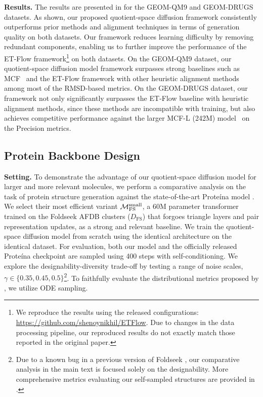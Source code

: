 \documentclass{article} %
\begin{document}
\textbf{Results.} The results are presented in  for the GEOM-QM9 and GEOM-DRUGS datasets. As shown, our proposed quotient-space diffusion framework consistently outperforms prior methods and alignment techniques in terms of generation quality on both datasets. Our framework reduces learning difficulty by removing redundant components, enabling us to further improve the performance of the ET-Flow framework\footnote{We reproduce the results using the released configurations: \url{https://github.com/shenoynikhil/ETFlow}. Due to changes in the data processing pipeline, our reproduced results do not exactly match those reported in the original paper.} on both datasets. %
On the GEOM-QM9 dataset, our quotient-space diffusion model framework surpasses strong baselines such as MCF~\citep{wang2023swallowing} and the ET-Flow framework with other heuristic alignment methods among most of the RMSD-based metrics. On the GEOM-DRUGS dataset, our framework not only significantly surpasses the ET-Flow baseline with heuristic alignment methods, since these methods are incompatible with training, but also achieves competitive performance against the larger MCF-L (242M) model~\citep{wang2023swallowing} on the Precision metrics. %



\subsection{Protein Backbone Design}


\textbf{Setting.} To demonstrate the advantage of our quotient-space diffusion model for larger and more relevant molecules,
we perform a comparative analysis on the task of protein structure generation against the state-of-the-art Prote\'ina model \citep{geffner2025proteina}.
We select their most efficient variant $\mathcal{M}_{\text{FS}}^{\text{small}}$, a 60M parameter transformer trained on the Foldseek AFDB clusters ($D_{\text{FS}}$) that forgoes triangle layers and pair representation updates, as a strong and relevant baseline.
We train the quotient-space diffusion model from scratch using the identical architecture on the identical dataset.
For evaluation, both our model and the officially released Prote\'ina checkpoint are sampled using 400 steps with self-conditioning.
We explore the designability-diversity trade-off by testing a range of noise scales, $\gamma \in\{0.35,0.45,0.5\}$\footnote{
Due to a known bug in a previous version of Foldseek \citep[Appendix~B]{daras2025ambient}, our comparative analysis in the main text is focused solely on the designability.
More comprehensive metrics evaluating our self-sampled structures are provided in .}.
To faithfully evaluate the distributional metrics proposed by \citet{geffner2025proteina}, we utilize ODE sampling.
\vspace{-5pt}
\end{document}
